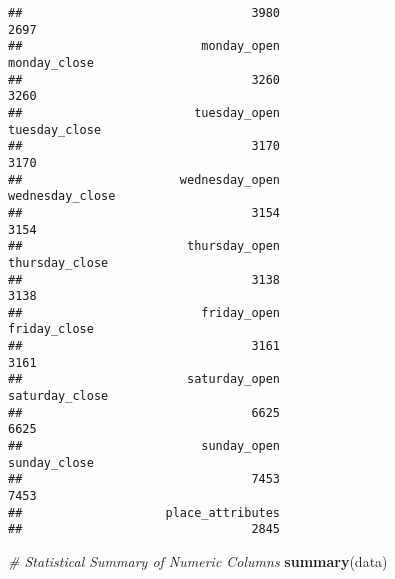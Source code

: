 \documentclass[
]{article}
\newenvironment{Shaded}{\begin{snugshade}}{\end{snugshade}}
\newcommand{\CommentTok}[1]{\textcolor[rgb]{0.56,0.35,0.01}{\textit{#1}}}
\newcommand{\FunctionTok}[1]{\textcolor[rgb]{0.13,0.29,0.53}{\textbf{#1}}}
\newcommand{\NormalTok}[1]{#1}
\begin{document}
\begin{verbatim}
##                                3980                                2697 
##                         monday_open                        monday_close 
##                                3260                                3260 
##                        tuesday_open                       tuesday_close 
##                                3170                                3170 
##                      wednesday_open                     wednesday_close 
##                                3154                                3154 
##                       thursday_open                      thursday_close 
##                                3138                                3138 
##                         friday_open                        friday_close 
##                                3161                                3161 
##                       saturday_open                      saturday_close 
##                                6625                                6625 
##                         sunday_open                        sunday_close 
##                                7453                                7453 
##                    place_attributes 
##                                2845
\end{verbatim}

\begin{Shaded}
\begin{Highlighting}[]
\CommentTok{\# Statistical Summary of Numeric Columns}
\FunctionTok{summary}\NormalTok{(data)}
\end{Highlighting}
\end{Shaded}
\end{document}
